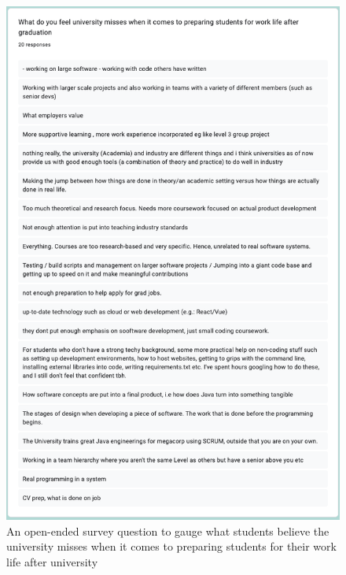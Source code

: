 \documentclass{l4proj}
\begin{document}
\begin{appendices}
\begin{figure}[!ht]
    \centering
    \includegraphics{dissertation/images/prog-survey-Q3.png}
    \caption{An open-ended survey question to gauge what students believe the university misses when it comes to preparing students for their work life after university}
    \label{fig:survey-q3}
\end{figure}


\end{appendices}
\end{document}

